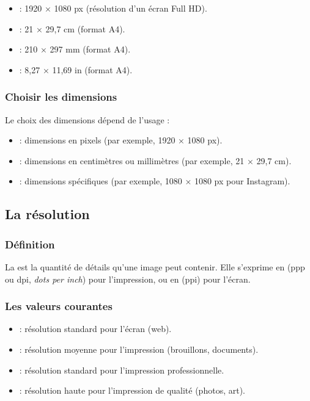 \begin{itemize}
    \item {} : 1920 × 1080 px (résolution d'un écran Full HD).
    \item {} : 21 × 29,7 cm (format A4).
    \item {} : 210 × 297 mm (format A4).
    \item {} : 8,27 × 11,69 in (format A4).
\end{itemize}

\subsubsection{Choisir les dimensions}

Le choix des dimensions dépend de l'usage :

\begin{itemize}
    \item {} : dimensions en pixels (par exemple, 1920 × 1080 px).
    \item {} : dimensions en centimètres ou millimètres (par exemple, 21 × 29,7 cm).
    \item {} : dimensions spécifiques (par exemple, 1080 × 1080 px pour Instagram).
\end{itemize}

\subsection{La résolution}

\subsubsection{Définition}

La  est la quantité de détails qu'une image peut contenir. Elle s'exprime en  (ppp ou dpi, \emph{dots per inch}) pour l'impression, ou en  (ppi) pour l'écran.

\subsubsection{Les valeurs courantes}

\begin{itemize}
    \item {} : résolution standard pour l'écran (web).
    \item {} : résolution moyenne pour l'impression (brouillons, documents).
    \item {} : résolution standard pour l'impression professionnelle.
    \item {} : résolution haute pour l'impression de qualité (photos, art).
\end{itemize}

